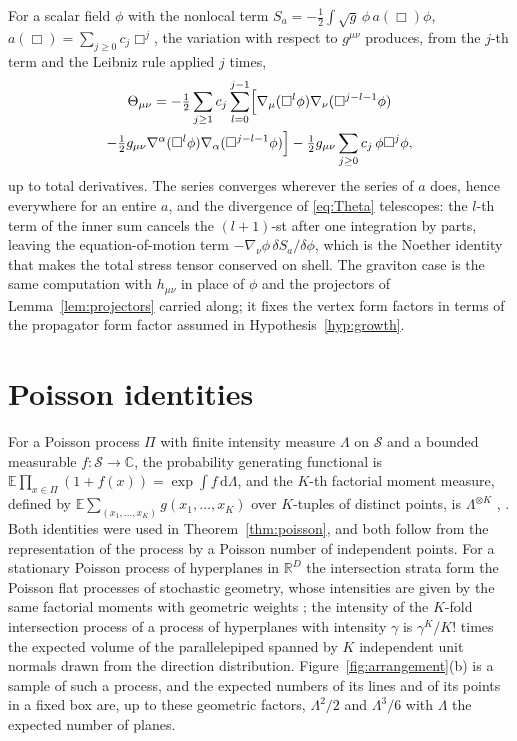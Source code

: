 \documentclass[aps,prd,10pt,twocolumn,superscriptaddress,nofootinbib,floatfix,longbibliography,showpacs,showkeys]{revtex4-2}
\theoremstyle{plain}
\theoremstyle{definition}
\theoremstyle{remark}
\newcommand{\bC}{\mathbb{C}}
\newcommand{\bR}{\mathbb{R}}
\newcommand{\bE}{\mathbb{E}}
\newcommand{\dd}{\mathrm{d}}
\begin{document}
For a scalar field $\phi$ with the nonlocal term $S_a=-\tfrac12\int\sqrt g\,\phi\,a(\Box)\phi$, $a(\Box)=\sum_{j\ge0}c_j\Box^j$, the variation with respect to $g^{\mu\nu}$ produces, from the $j$-th term and the Leibniz rule applied $j$ times,
\begin{multline}
\label{eq:Theta}
\Theta_{\mu\nu}=-\tfrac12\sum_{j\ge1}c_j\sum_{l=0}^{j-1}\Bigl[\nabla_\mu(\Box^l\phi)\nabla_\nu(\Box^{j-l-1}\phi)\\
-\tfrac12g_{\mu\nu}\nabla^\alpha(\Box^l\phi)\nabla_\alpha(\Box^{j-l-1}\phi)\Bigr]
-\tfrac12g_{\mu\nu}\sum_{j\ge0}c_j\,\phi\Box^j\phi ,
\end{multline}
up to total derivatives. The series converges wherever the series of $a$ does, hence everywhere for an entire $a$, and the divergence of \eqref{eq:Theta} telescopes: the $l$-th term of the inner sum cancels the $(l+1)$-st after one integration by parts, leaving the equation-of-motion term $-\nabla_\nu\phi\,\delta S_a/\delta\phi$, which is the Noether identity that makes the total stress tensor conserved on shell. The graviton case is the same computation with $h_{\mu\nu}$ in place of $\phi$ and the projectors of Lemma~\ref{lem:projectors} carried along; it fixes the vertex form factors in terms of the propagator form factor assumed in Hypothesis~\ref{hyp:growth}.

\section{Poisson identities}
\label{app:poisson}

For a Poisson process $\Pi$ with finite intensity measure $\Lambda$ on $\mathcal S$ and a bounded measurable $f:\mathcal S\to\bC$, the probability generating functional is $\bE\prod_{x\in\Pi}(1+f(x))=\exp\int f\,\dd\Lambda$, and the $K$-th factorial moment measure, defined by $\bE\sum_{(x_1,\dots,x_K)}g(x_1,\dots,x_K)$ over $K$-tuples of distinct points, is $\Lambda^{\otimes K}$ \cite[Chapters 3 and 4]{LastPenrose2017}, \cite{Kingman1993}. Both identities were used in Theorem~\ref{thm:poisson}, and both follow from the representation of the process by a Poisson number of independent points. For a stationary Poisson process of hyperplanes in $\bR^D$ the intersection strata form the Poisson flat processes of stochastic geometry, whose intensities are given by the same factorial moments with geometric weights \cite[Chapter~4]{SchneiderWeil2008}; the intensity of the $K$-fold intersection process of a process of hyperplanes with intensity $\gamma$ is $\gamma^K/K!$ times the expected volume of the parallelepiped spanned by $K$ independent unit normals drawn from the direction distribution. Figure~\ref{fig:arrangement}(b) is a sample of such a process, and the expected numbers of its lines and of its points in a fixed box are, up to these geometric factors, $\Lambda^2/2$ and $\Lambda^3/6$ with $\Lambda$ the expected number of planes.
\end{document}
